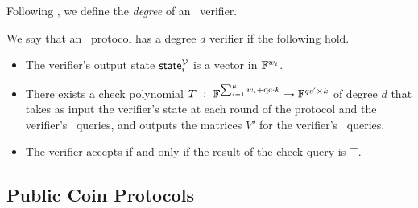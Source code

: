 Following \cite{BonehBCGI19}, we define the \emph{degree} of an \ILC\ verifier.

\begin{definition}
We say that an \ILC\ protocol has a degree $d$ verifier if the following hold.
\begin{itemize}
\item The verifier's output state $\mathsf{state}_i^{\mathcal{V}}$ is a vector in $\mathbb{F}^{w_i}$.
\item There exists a check polynomial $T \ : \ \mathbb{F}^{\sum_{i=1}^\mu w_i + \mathrm{qc} \cdot k} \to \mathbb{F}^{qc' \times k}$ of degree $d$ that takes as input the verifier's state at each round of the protocol and the verifier's \ILCopen\ queries, and outputs the matrices $V'$ for the verifier's \ILCcheck\ queries.
\item The verifier accepts if and only if the result of the check query is $\top$.
\end{itemize}
\end{definition}

\subsection{Public Coin Protocols}

